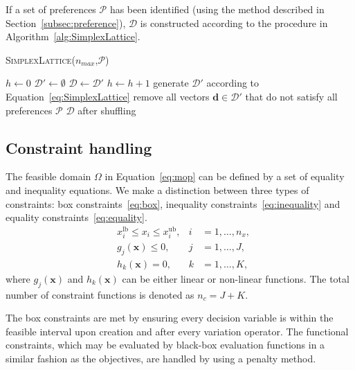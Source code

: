 \documentclass[a4paper]{article}
\newcommand{\brr}[1]{{\left({#1}\right)}} %
\newcommand{\brabs}[1]{\left\vert{#1}\right\vert} %
\newcommand{\vx}{\ensuremath{\mathbf{x}}} %
\newcommand{\vd}{\ensuremath{\mathbf{d}}} %
\newcommand{\DSet}{\ensuremath{\mathcal{D}}} %
\newcommand{\Pref}{\ensuremath{\mathcal{P}}} %
\begin{document}
If a set of preferences $\Pref$ has been identified (using the method described in Section~\ref{subsec:preference}), $\DSet$ is constructed according to the procedure in Algorithm~\ref{alg:SimplexLattice}.
\begin{algorithm}
\caption{\textsc{SimplexLattice($n_{max}$,\Pref)}}
\label{alg:SimplexLattice}
\begin{algorithmic}[1]
	\State $h \leftarrow 0$
	\State $\DSet' \leftarrow \emptyset$
	\While{$\brabs{\DSet'}<n_{max}$}
		\State $\DSet \leftarrow \DSet'$
		\State $h \leftarrow h+1$
		\State generate $\DSet'$ according to Equation~\eqref{eq:SimplexLattice}
		\State remove all vectors $\vd\in\DSet'$ that do not satisfy all preferences $\Pref$
	\EndWhile
	\State \Return $\DSet$ after shuffling 
\end{algorithmic}
\end{algorithm}

\subsection{Constraint handling}
\label{subsec:constraints}
The feasible domain $\Omega$ in Equation~\eqref{eq:mop} can be defined by a set of equality and inequality equations. We make a distinction between three types of constraints: box constraints~\eqref{eq:box}, inequality constraints~\eqref{eq:inequality} and equality constraints~\eqref{eq:equality}.
\begin{align}
\label{eq:box} &x_i^\text{lb} \leq x_i \leq x_i^\text{ub},& i&=1,\ldots,n_x,\\
\label{eq:inequality} &g_j\brr{\vx} \leq 0,& j&=1,\ldots,J,\\
\label{eq:equality} &h_k\brr{\vx} = 0,& k&=1,\ldots,K,
\end{align}
where $g_j\brr{\vx}$ and $h_k\brr{\vx}$ can be either linear or non-linear functions. The total number of constraint functions is denoted as $n_c=J+K$.

The box constraints are met by ensuring every decision variable is within the feasible interval upon creation and after every variation operator. The functional constraints, which may be evaluated by black-box evaluation functions in a similar fashion as the objectives, are handled by using a penalty method.
\end{document}
